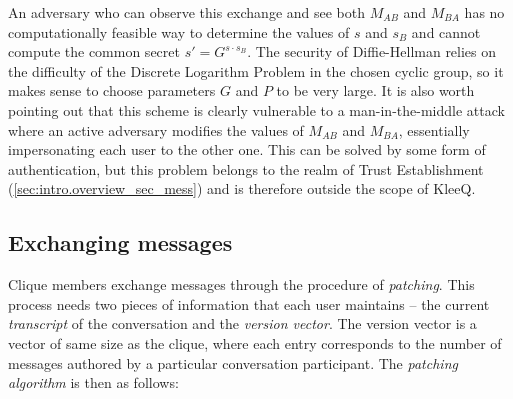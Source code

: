 \documentclass[a4paper, 12pt]{report}
\begin{document}
An adversary who can observe this exchange and see both $M_{AB}$ and $M_{BA}$ has no computationally feasible way to determine the values of $s$ and $s_B$ and cannot compute the common secret $s' = G^{s \cdot s_B}$. The security of Diffie-Hellman relies on the difficulty of the Discrete Logarithm Problem in the chosen cyclic group, so it makes sense to choose parameters $G$ and $P$ to be very large. It is also worth pointing out  that this scheme is clearly vulnerable to a man-in-the-middle attack where an active adversary modifies the values of $M_{AB}$ and $M_{BA}$, essentially impersonating each user to the other one. This can be solved by some form of authentication, but this problem belongs to the realm of Trust Establishment (\cref{sec:intro.overview_sec_mess}) and is therefore outside the scope of KleeQ.


\subsection{Exchanging messages}
\label{subsec:prep.patching}
Clique members exchange messages through the procedure of \emph{patching}. This process needs two pieces of information that each user maintains -- the current \emph{transcript} of the conversation and the \emph{version vector}. The version vector is a vector of same size as the clique, where each entry corresponds to the number of messages authored by a particular conversation participant. The \emph{patching algorithm} is then as follows: \\ 
\end{document}
